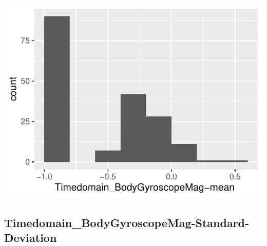 \documentclass[
]{article}
\begin{document}
\begin{minipage}{0.25 \textwidth}

\includegraphics{codebook_tidydatasub_files/figure-latex/Var-39-Timedomain-BodyGyroscopeMag-mean--1.pdf}

\end{minipage}

\noindent\makebox[\linewidth]{\rule{\textwidth}{0.4pt}}

\hypertarget{timedomain_bodygyroscopemag-standard-deviation}{%
\subsection{Timedomain\_BodyGyroscopeMag-Standard-Deviation}\label{timedomain_bodygyroscopemag-standard-deviation}}
\end{document}

